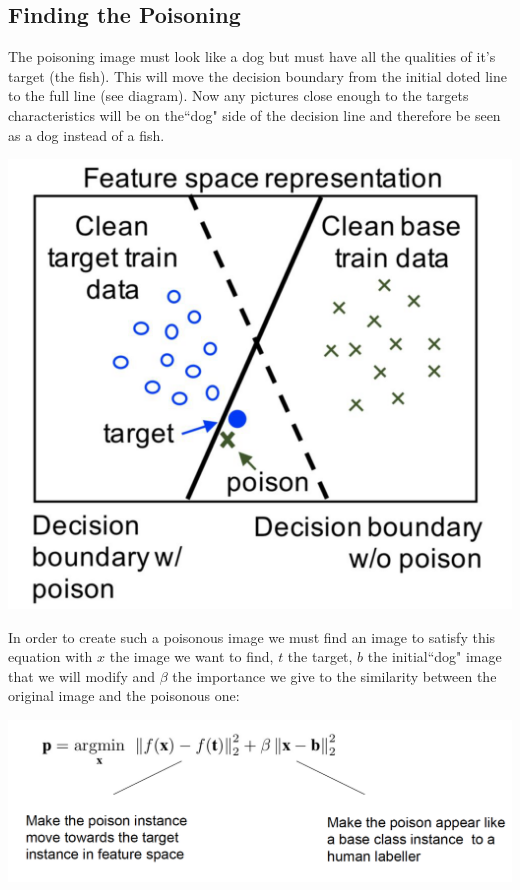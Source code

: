 \documentclass[twoside]{article}
\begin{document}
\subsection{Finding the Poisoning}

The poisoning image must look like a dog but must have all the qualities of it's target (the fish). This will move the decision boundary from the initial doted line to the full line (see diagram). Now any pictures close enough to the targets characteristics will be on the``dog" side of the decision line and therefore be seen as a dog instead of a fish.

\begin{center}
    \includegraphics[scale=0.3]{DataLinePoison.png}
\end{center}

In order to create such a poisonous image we must find an image to satisfy this equation with $x$ the image we want to find, $t$ the target, $b$ the initial``dog" image that we will modify and $\beta$ the importance we give to the similarity between the original image and the poisonous one:

\begin{center}
    \includegraphics[scale=0.3]{Formula.png}
\end{center}
\end{document}
